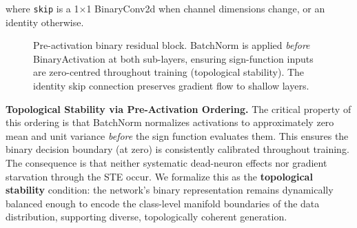 \documentclass[conference]{IEEEtran}
\begin{document}
where \texttt{skip} is a 1$\times$1 BinaryConv2d when channel dimensions change, or an
identity otherwise.

\begin{figure}[t]
\centering
\caption{Pre-activation binary residual block. BatchNorm is applied \emph{before}
BinaryActivation at both sub-layers, ensuring sign-function inputs are
zero-centred throughout training (topological stability). The identity skip
connection preserves gradient flow to shallow layers.}
\label{fig:block}
\end{figure}

\textbf{Topological Stability via Pre-Activation Ordering.} The critical property of
this ordering is that BatchNorm normalizes activations to approximately zero mean and
unit variance \emph{before} the sign function evaluates them. This ensures the binary
decision boundary (at zero) is consistently calibrated throughout training. The
consequence is that neither systematic dead-neuron effects nor gradient starvation
through the STE occur. We formalize this as the \textbf{topological stability}
condition: the network's binary representation remains dynamically balanced enough to
encode the class-level manifold boundaries of the data distribution, supporting diverse,
topologically coherent generation.
\end{document}
